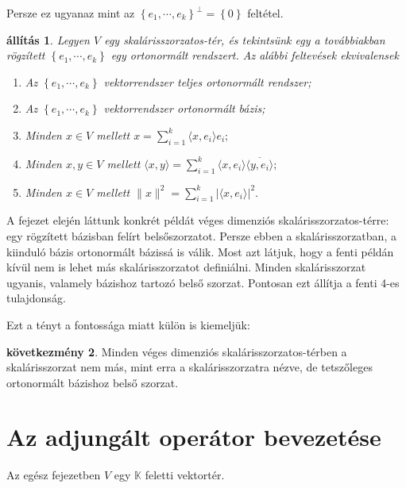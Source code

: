 \documentclass[9pt, a4paper, showtrims]{memoir}
\theoremstyle{plain}
\newtheorem{proposition}{állítás}[chapter]
\theoremstyle{remark}
\theoremstyle{definition}
\newtheorem{corollary}[proposition]{következmény}
\newcommand{\ip}[2]{\langle#1,#2\rangle}
\begin{document}
Persze ez ugyanaz mint az
$\left\{ e_1,\cdots,e_k \right\}^\perp =\left\{ 0 \right\}$
feltétel.

\begin{proposition}
    Legyen $V$ egy skalárisszorzatos-tér, 
    és tekintsünk egy a továbbiakban rögzített 
    $\left\{ e_1,\cdots,e_k \right\}$ egy ortonormált rendszert.
    Az alábbi feltevések ekvivalensek
    \begin{enumerate}
        \item
            Az $\left\{ e_1,\cdots,e_k \right\}$ vektorrendszer teljes ortonormált rendszer;
        \item 
            Az $\left\{ e_1,\cdots,e_k \right\}$ vektorrendszer ortonormált bázis;
        \item
            Minden $x\in V$ mellett 
            \(
                x=
                \sum_{i=1}^k\ip{x}{e_i}e_i;
            \)
        \item
            Minden $x,y\in V$ mellett
            \(
                \ip{x}{y}=
                \sum_{i=1}^k\ip{x}{e_i}\overline{\ip{y}{e_i}};
            \)
        \item
            Minden $x\in V$ mellett
            \(
                \|x\|^2=
                \sum_{i=1}^k|\ip{x}{e_i}|^2.
            \)
                \qedhere
    \end{enumerate}
\end{proposition}

A fejezet elején láttunk konkrét példát véges dimenziós skalárisszorzatos-térre:
egy rögzített bázisban felírt belsőszorzatot. Persze ebben a skalárisszorzatban,
a kiinduló bázis ortonormált bázissá is válik.
Most azt látjuk, hogy a fenti példán kívül nem is lehet más skalárisszorzatot definiálni.
Minden skalárisszorzat ugyanis, valamely bázishoz tartozó belső szorzat.
Pontosan ezt állítja a fenti 4-es tulajdonság.

Ezt a tényt a fontossága miatt külön is kiemeljük:
\begin{corollary}
    Minden véges dimenziós skalárisszorzatos-térben a skalárisszorzat nem más, 
    mint erra a skalárisszorzatra nézve, de tetszőleges ortonormált bázishoz belső szorzat.
\end{corollary}

\chapter{Az adjungált operátor bevezetése}
Az egész fejezetben $V$ egy $\mathbb{K}$ feletti vektortér.
\end{document}
